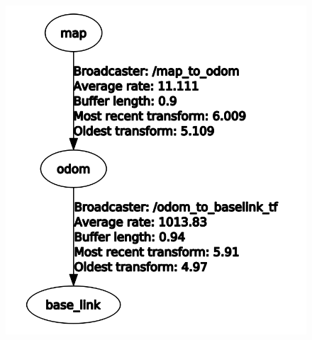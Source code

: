 \documentclass{beamer}
\begin{document}
\begin{frame}[allowframebreaks]
\begin{columns}
\begin{figure}[H]
    \centering
    \includegraphics[scale=0.28]{img/ros_tools/rqttftree_dwa.png}
\end{figure}

\end{columns}

\end{frame}

\end{document}

